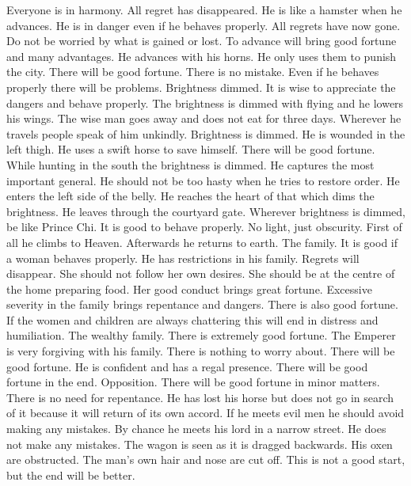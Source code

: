 	{Everyone is in harmony. All regret has disappeared.}
	{He is like a hamster when he advances. He is in danger even if he behaves properly.}
	{All regrets have now gone. Do not be worried by what is gained or lost. To advance will bring good fortune
		and many advantages.}
	{He advances with his horns. He only uses them to punish the city. There will be good fortune. There is no
		mistake. Even if he behaves properly there will be problems.}
\or {}
	{Brightness dimmed. It is wise to appreciate the dangers and behave properly.}
	{The brightness is dimmed with flying and he lowers his wings. The wise man goes away and does not eat
		for three days. Wherever he travels people speak of him unkindly.}
	{Brightness is dimmed. He is wounded in the left thigh. He uses a swift horse to save himself. There
		will be good fortune.}
	{While hunting in the south the brightness is dimmed. He captures the most important general. He should not
		be too hasty when he tries to restore order.}
	{He enters the left side of the belly. He reaches the heart of that which dims the brightness. He leaves
		through the courtyard gate.}
	{Wherever brightness is dimmed, be like Prince Chi. It is good to behave properly.}
	{No light, just obscurity. First of all he climbs to Heaven. Afterwards he returns to earth.}
\or {}
	{The family. It is good if a woman behaves properly.}
	{He has restrictions in his family. Regrets will disappear.}
	{She should not follow her own desires. She should be at the centre of the home preparing food. Her good
		conduct brings great fortune.}
	{Excessive severity in the family brings repentance and dangers. There is also good fortune. If the women and
		children are always chattering this will end in distress and humiliation.}
	{The wealthy family. There is extremely good fortune.}
	{The Emperer is very forgiving with his family. There is nothing to worry about. There will be good fortune.}
	{He is confident and has a regal presence. There will be good fortune in the end.}
\or {}
	{Opposition. There will be good fortune in minor matters.}
	{There is no need for repentance. He has lost his horse but does not go in search of it because it will
		return of its own accord. If he meets evil men he should avoid making any mistakes.}
	{By chance he meets his lord in a narrow street. He does not make any mistakes.}
	{The wagon is seen as it is dragged backwards. His oxen are obstructed. The man's own hair and nose are
		cut off. This is not a good start, but the end will be better.}

